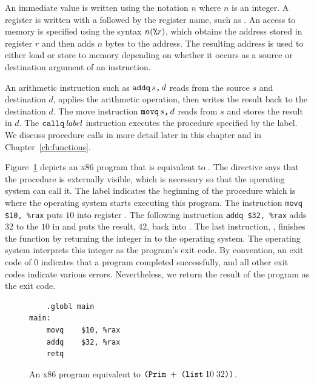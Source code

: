\documentclass[11pt]{book}
\begin{document}
An immediate value is written using the notation \key{\$}$n$ where $n$
is an integer.
%
A register is written with a \key{\%} followed by the register name,
such as .
%
An access to memory is specified using the syntax $n(\texttt{\%}r)$,
which obtains the address stored in register $r$ and then adds $n$
bytes to the address. The resulting address is used to either load or
store to memory depending on whether it occurs as a source or
destination argument of an instruction.

An arithmetic instruction such as $\texttt{addq}\,s\texttt{,}\,d$ reads from the
source $s$ and destination $d$, applies the arithmetic operation, then
writes the result back to the destination $d$.
%
The move instruction $\texttt{movq}\,s\texttt{,}\,d$ reads from $s$ and
stores the result in $d$.
%
The $\texttt{callq}\,\mathit{label}$ instruction executes the procedure
specified by the label. We discuss procedure calls in more detail
later in this chapter and in Chapter~\ref{ch:functions}.

Figure~\ref{fig:p0-x86} depicts an x86 program that is equivalent
to . The  directive says that the
 procedure is externally visible, which is necessary so
that the operating system can call it. The label 
indicates the beginning of the  procedure which is where
the operating system starts executing this program.  The instruction
\lstinline{movq $10, %rax} puts $10$ into register . The
following instruction \lstinline{addq $32, %rax} adds $32$ to the
$10$ in  and puts the result, $42$, back into
  .
%
The last instruction, , finishes the  function by
returning the integer in  to the operating system. The
operating system interprets this integer as the program's exit
code. By convention, an exit code of 0 indicates that a program
completed successfully, and all other exit codes indicate various
errors.  Nevertheless, we return the result of the program as the exit
code.

\begin{figure}[tbp]
\begin{lstlisting}
	.globl main
main:
	movq	$10, %rax
	addq	$32, %rax
	retq
\end{lstlisting}
\caption{An x86 program equivalent to $\texttt{(Prim}\;+\;\texttt{(list}\;10\;32\texttt{))}$.}
\label{fig:p0-x86}
\end{figure}
\end{document}
